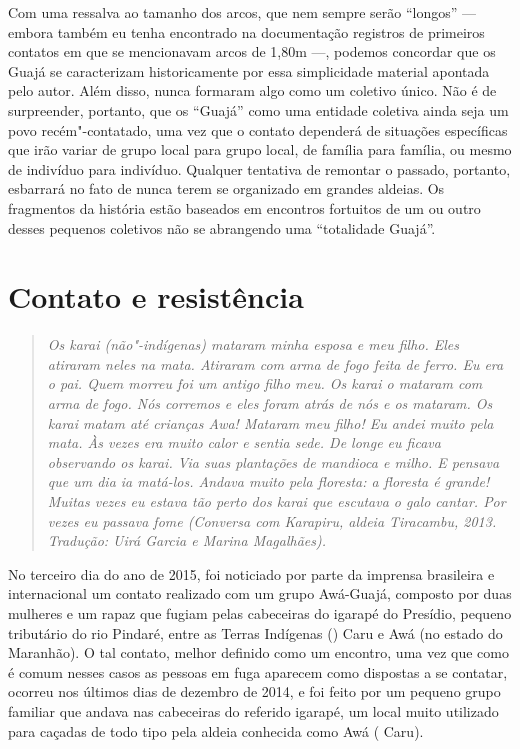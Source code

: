 Com uma ressalva ao tamanho dos arcos, que nem sempre serão ``longos'' ---
embora também eu tenha encontrado na documentação registros de primeiros
contatos em que se mencionavam arcos de 1,80m ---, podemos concordar que
os Guajá se caracterizam historicamente por essa simplicidade material
apontada pelo autor. Além disso, nunca formaram algo como um coletivo
único. Não é de surpreender, portanto, que os ``Guajá'' como uma entidade
coletiva ainda seja um povo recém"-contatado, uma vez que o contato
dependerá de situações específicas que irão variar de grupo local para
grupo local, de família para família, ou mesmo de indivíduo para
indivíduo. Qualquer tentativa de remontar o passado, portanto, esbarrará
no fato de nunca terem se organizado em grandes aldeias. Os fragmentos
da história estão baseados em encontros fortuitos de um ou outro desses
pequenos coletivos não se abrangendo uma ``totalidade Guajá''.

\section{Contato e resistência}

\begin{quote}
\emph{Os karai (não"-indígenas) mataram minha esposa e meu filho. Eles
atiraram neles na mata. Atiraram com arma de fogo feita de ferro. Eu era
o pai. Quem morreu foi um antigo filho meu. Os karai o mataram com arma
de fogo. Nós corremos e eles foram atrás de nós e os mataram. Os karai
matam até crianças Awa! Mataram meu filho! Eu andei muito pela mata. Às
vezes era muito calor e sentia sede. De longe eu ficava observando os
karai. Via suas plantações de mandioca e milho. E pensava que um dia ia
matá-los. Andava muito pela floresta: a floresta é grande! Muitas vezes
eu estava tão perto dos karai que escutava o galo cantar. Por vezes eu
passava fome (Conversa com Karapiru, aldeia Tiracambu, 2013.
Tradução: Uirá Garcia e Marina Magalhães).}
\end{quote}

No terceiro dia do ano de 2015, foi noticiado por parte da imprensa
brasileira e internacional um contato realizado com um grupo Awá-Guajá,
composto por duas mulheres e um rapaz que fugiam pelas cabeceiras do
igarapé do Presídio, pequeno tributário do rio Pindaré, entre as Terras
Indígenas () Caru e Awá (no estado do Maranhão). O tal contato, melhor
definido como um encontro, uma vez que como é comum nesses casos as
pessoas em fuga aparecem como dispostas a se contatar, ocorreu nos
últimos dias de dezembro de 2014, e foi feito por um pequeno grupo
familiar que andava nas cabeceiras do referido igarapé, um local muito
utilizado para caçadas de todo tipo pela aldeia conhecida como Awá (
Caru).


